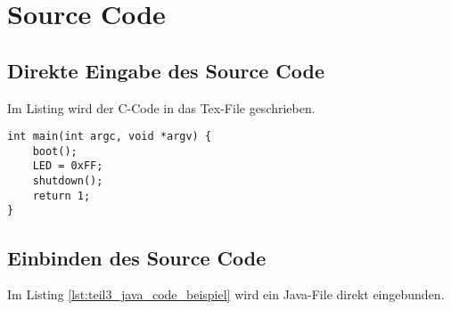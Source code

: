 \chapter{Source Code}
\label{chap:teil3_sourcecode}


\section{Direkte Eingabe des Source Code}

Im Listing  wird der C-Code in das Tex-File geschrieben.

\begin{lstlisting}[style=CCode, label=lst:teil3_c_code_beispiel, caption=C-Code Beispiel]
int main(int argc, void *argv) {
	boot();
	LED = 0xFF;
	shutdown();
	return 1;
}
\end{lstlisting}


\section{Einbinden des Source Code}

Im Listing \ref{lst:teil3_java_code_beispiel} wird ein Java-File direkt eingebunden.


